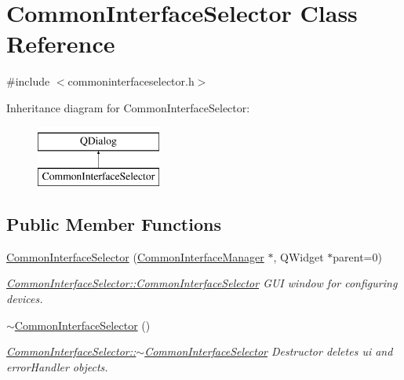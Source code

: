 \hypertarget{class_common_interface_selector}{}\section{Common\+Interface\+Selector Class Reference}
\label{class_common_interface_selector}


{\ttfamily \#include $<$commoninterfaceselector.\+h$>$}

Inheritance diagram for Common\+Interface\+Selector\+:\begin{figure}[H]
\begin{center}
\leavevmode
\includegraphics[height=2.000000cm]{class_common_interface_selector}
\end{center}
\end{figure}
\subsection*{Public Member Functions}
\begin{DoxyCompactItemize}
\item 
\hyperlink{class_common_interface_selector_a46da3e73aa0868810dbd80a42281a6c8}{Common\+Interface\+Selector} (\hyperlink{class_common_interface_manager}{Common\+Interface\+Manager} $\ast$, Q\+Widget $\ast$parent=0)
\begin{DoxyCompactList}\small\item\em \hyperlink{class_common_interface_selector_a46da3e73aa0868810dbd80a42281a6c8}{Common\+Interface\+Selector\+::\+Common\+Interface\+Selector} G\+UI window for configuring devices. \end{DoxyCompactList}\item 
\hyperlink{class_common_interface_selector_acee1f5895e8678895f18edb5941f9160}{$\sim$\+Common\+Interface\+Selector} ()
\begin{DoxyCompactList}\small\item\em \hyperlink{class_common_interface_selector_acee1f5895e8678895f18edb5941f9160}{Common\+Interface\+Selector\+::$\sim$\+Common\+Interface\+Selector} Destructor deletes ui and error\+Handler objects. \end{DoxyCompactList}\end{DoxyCompactItemize}


